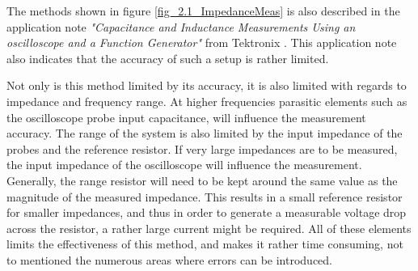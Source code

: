 The methods shown in figure \ref{fig_2.1_ImpedanceMeas} is also described in the application note \textit{"Capacitance and Inductance Measurements Using an oscilloscope and a Function Generator"} from Tektronix \Cite{TextronixZMeas}. This application note also indicates that the accuracy of such a setup is rather limited.

Not only is this method limited by its accuracy, it is also limited with regards to impedance and frequency range. At higher frequencies parasitic elements such as the oscilloscope probe input capacitance, will influence the measurement accuracy. The range of the system is also limited by the input impedance of the probes and the reference resistor. If very large impedances are to be measured, the input impedance of the oscilloscope will influence the measurement. Generally, the range resistor will need to be kept around  the same value as the magnitude of the measured impedance. This results in a small reference resistor for smaller impedances, and thus in order to generate a measurable voltage drop across the resistor, a rather large current might be required. All of these elements limits the effectiveness of this method, and makes it rather time consuming, not to mentioned the numerous areas where errors can be introduced.
